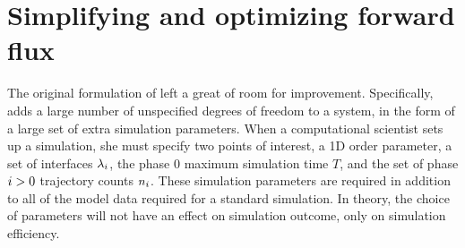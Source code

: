 %


\section{Simplifying and optimizing forward flux}
The original formulation of \cite{Allen:2005wy} left a great of room for improvement. Specifically,  adds a large number of unspecified degrees of freedom to a system, in the form of a large set of extra simulation parameters. When a computational scientist sets up a  simulation, she must specify two points of interest, a 1D order parameter, a set of interfaces ${\lambda}_{i}$, the phase $0$ maximum simulation time $T$, and the set of phase $i>0$ trajectory counts $n_{i}$. These simulation parameters are required in addition to all of the model data required for a standard  simulation. In theory, the choice of  parameters will not have an effect on simulation outcome\cite{Allen:2009kb}, only on simulation efficiency. 

